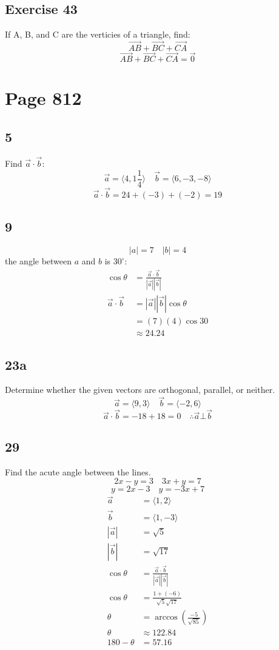 \documentclass{math}
\begin{document}
\subsection*{Exercise 43}
If A, B, and C are the verticies of a triangle, find:
\[ \vec{AB}+\vec{BC}+\vec{CA} \]
\[ \vec{AB}+\vec{BC}+\vec{CA} = \vec{0} \]

\section*{Page 812}

\subsection*{5}
Find \( \vec{a}\cdot\vec{b} \):
\[ \vec{a} = \langle4,1\frac{1}{4}\rangle \quad
  \vec{b} = \langle6,-3,-8\rangle \]
\[ \vec{a}\cdot\vec{b} = 24+(-3)+(-2) = 19 \]

\subsection*{9}
\[ |a| = 7 \quad |b| = 4 \]
the angle between \( a \) and \( b \) is \( 30^{\circ} \):
\begin{align*}
  \cos\theta &= \frac{\vec{a}\cdot\vec{b}}{|\vec{a}||\vec{b}|} \\
  \vec{a}\cdot\vec{b} &= |\vec{a}||\vec{b}|\cos\theta \\
  &= (7)(4)\cos30 \\
  &\approx 24.24
\end{align*}

\subsection*{23a}
Determine whether the given vectors are orthogonal, parallel, or neither.
\[ \vec{a} = \langle9,3\rangle \quad \vec{b} = \langle-2,6\rangle \]
\[ \vec{a}\cdot\vec{b} = -18+18 = 0 \quad\therefore \vec{a}\bot\vec{b} \]

\subsection*{29}
Find the acute angle between the lines.
\[ 2x-y = 3 \quad 3x+y = 7 \]
\[ y = 2x-3 \quad y = -3x+7 \]
\begin{align*}
  \vec{a} &= \langle1,2\rangle \\
  \vec{b} &= \langle1,-3\rangle \\
  |\vec{a}| &= \sqrt{5} \\
  |\vec{b}| &= \sqrt{17} \\
  \cos\theta &= \frac{\vec{a}\cdot\vec{b}}{|\vec{a}||\vec{b}|} \\
  \cos\theta &= \frac{1+(-6)}{\sqrt{5}\sqrt{17}} \\
  \theta &= \arccos(\frac{-5}{\sqrt{85}}) \\
  \theta &\approx 122.84 \\
  180-\theta &= 57.16
\end{align*}
\end{document}
